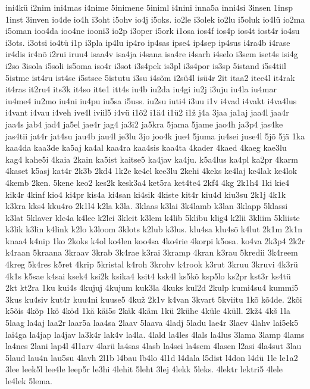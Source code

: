 {ini4kü
i2nim
ini4mas
i4nime
5inimene
5iniml
i4nini
inna5a
inni4si
3insen
1insp
1inst
3inven
io4de
io4h
i3oht
i5ohv
io4j
i5oks.
io2le
i3olek
io2lu
i5oluk
io4lü
io2ma
i5oman
ioo4da
ioo4ne
iooni3
io2p
i3oper
i5ork
i1osa
ios4f
ios4p
ios4t
iost4r
io4su
i3ots.
i3otsi
io4tü
i1p
i3pla
ip4lu
ip4ro
ip4sas
ipse4
ip4sep
ip4sus
i4ra4b
i4rase
ir4dis
ir4nõ
i2rui
iruu4
isaa4v
isa4ja
i4sana
isa4re
i4sarh
i4selo
i3sem
iset4s
isi4g
i2so
3isola
i5soli
is5oma
iso4r
i3sot
i3s4pek
is3pl
i3s4por
is3sp
5istand
i5s4tiil
5istme
ist4ru
ist4se
i5stsee
5istutu
i3su
i4sõm
i2sü4l
isü4r
2it
itaa2
itee4l
it4rak
it4ras
it2ru4
its3k
it4so
itte1
itt4s
iu4b
iu2da
iu4gi
iu2j
i3uju
iu4la
iu4mar
iu4me4
iu2mo
iu4ni
iu4pu
iu5sa
i5uss.
iu2su
iuti4
i3uu
i1v
i4vad
i4vakt
i4va4lus
i4vant
i4vau
i4veh
ive4l
iviil5
i4vü
i1õ2
i1ä4
i1ü2
i1ž
j4a
3jaa
ja1aj
jaa4l
jaa4r
jaa4s
jab4
jad4
ja5el
jae4r
jag4
ja3i2
ja5kra
5jama
5jame
jao4h
ja3p4
jas4ke
jas4tii
jat4r
jat4su
jau4b
jau4l
je3lu
3jo
joo4k
jue4
5juma
ju4sei
juse4l
5jõ
5jä
1ka
kaa4da
kaa3de
ka5aj
ka4al
kaa4ra
kaa4sis
kaa4ta
4kader
4kaed
4kaeg
kae3lu
kag4
kahe5i
4kaia
2kain
ka5ist
kaitse5
ka4jav
ka4ju.
k5a4lus
ka4pl
ka2pr
4karm
4kaset
k5asj
kat4r
2k3b
2kd4
1k2e
ke4el
kee3lu
2kehi
4keks
ke4laj
ke4lak
ke4lok
4kemb
2ken.
5kene
keo2
kes2k
kesk3a4
ket5ra
ket4te4
2kf4
4kg
2k1h4
1ki
kie4
kik4r
4kinf
kio4
ki4pr
kis4a
ki4san
ki4sik
4kiste
kit4r
kiu4d
kiu3su
2k1j
4k1k
k3kra
kks4
kku4ro
2k1l4
k2la
k3la.
3klaas
k3lai
3k4lamb
k3lan
3klapp
5klassi
k3lat
5klaver
kle4a
k4lee
k2lei
3kleit
k3lem
k4lib
5klibu
klig4
k2lii
3kliim
5kliiste
k3lik
k3lin
k4link
k2lo
k3loom
3klots
k2lub
k3lus.
klu4sa
klu4sõ
k4lut
2k1m
2k1n
knaa4
k4nip
1ko
2koks
k4ol
ko4len
koo4sa
4ko4rie
4korpi
k5osa.
ko4va
2k3p4
2k2r
k4raan
5kraana
3kraav
3krab
3k4rae
k3rai
3kramp
4kran
k3rau
5kredii
3k4reem
4kreg
5k4res
k5ret
4krip
5kristal
k4roh
3krohv
k4rook
k3rut
3kruu
3kruvi
4k3rü
4k1s
k5sae
k4sai
ksek4
ksi2k
ksika4
ksit4
ksk4l
ks5kõ
ksp5lo
ks2pr
kst3r
ks4tü
2kt
kt2ra
1ku
kui4s
4kujuj
4kujum
kuk3la
4kuks
kul2d
2kulp
kumi4su4
kummi5
3kus
ku4siv
kut4r
kuu4ni
kuuse5
4kuž
2k1v
k4van
3kvart
5kviitu
1kõ
kõ4de.
2kõi
k5õis
4kõp
1kö
4köd
1kä
käi5s
2käk
4käm
1kü
2kühe
4küle
4küll.
2kž4
4kš
1la
5laag
la4aj
laa2r
laar5a
laa4sa
2laav
5laava
4ladj
5ladu
lae4r
3laev
4lahv
lai5ek5
lai4ga
la4jap
la4jav
la3k4r
lak4v
la4la.
4lald
la4les
4lals
la4lus
3lama
3lamp
4lams
la4nes
2lani
lap4l
4l1arv
4larü
la4sas
4lasb
la4sei
la4sem
4lasen
l2asi
4la4sut
3lau
5laud
lau4n
lau5su
4lavh
2l1b
l4bau
lb4lo
4l1d
l4dala
l5dist
l4don
l4dü
1le
le1a2
3lee
leek5l
lee4le
leep5r
le3hi
4lehit
5leht
3lej
4lekk
5leks.
4lektr
lektri5
4lele
le4lek
5lema.
}
